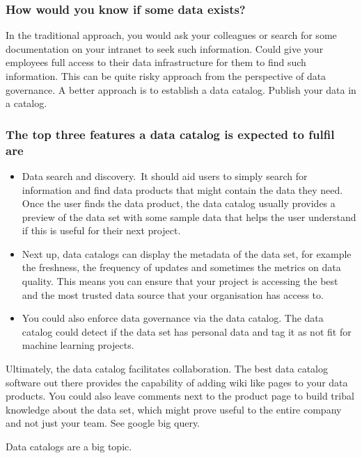 \subsubsection{How would you know if some data exists?}
In the traditional approach, you would ask your colleagues or search for some documentation on your intranet to seek such information.
Could give your employees full access to their data infrastructure for them to find such information.
This can be quite risky approach from the perspective of data governance.
A better approach is to establish a data catalog.
Publish your data in a catalog.

\subsubsection{The top three features a data catalog is expected to fulfil are}
\begin{itemize}
    \item Data search and discovery.\ It should aid users to simply search for information and find data products that might contain the data they need. Once the user finds the data product, the data catalog usually provides a preview of the data set with some sample data that helps the user understand if this is useful for their next project.
    \item Next up, data catalogs can display the metadata of the data set, for example the freshness, the frequency of updates and sometimes the metrics on data quality. This means you can ensure that your project is accessing the best and the most trusted data source that your organisation has access to.
    \item You could also enforce data governance via the data catalog. The data catalog could detect if the data set has personal data and tag it as not fit for machine learning projects.
\end{itemize}

Ultimately, the data catalog facilitates collaboration.
The best data catalog software out there provides the capability of adding wiki like pages to your data products.
You could also leave comments next to the product page to build tribal knowledge about the data set, which might prove useful to the entire company and not just your team.
See google big query.

\begin{note}
    Data catalogs are a big topic.
\end{note}

